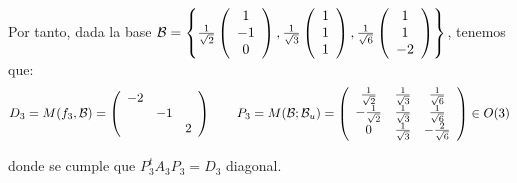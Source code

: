 \begin{ejercicio}
\begin{enumerate}
        Por tanto, dada la base $\mathcal{B}=\left\{\frac{1}{\sqrt{2}}\left(\begin{array}{c}
                1 \\ -1 \\ 0
            \end{array}\right),
            \frac{1}{\sqrt{3}}\left(\begin{array}{c}
                1 \\ 1 \\ 1 
            \end{array}\right),
            \frac{1}{\sqrt{6}}\left(\begin{array}{c}
                1 \\ 1 \\ -2 
        \end{array}\right)\right\}$, tenemos que:
        \begin{equation*}
            D_3=M(f_3,\mathcal{B})=\left(\begin{array}{ccc}
                -2 \\
                & -1\\
                && 2
            \end{array}\right)
            \qquad
            P_3=M(\mathcal{B};\mathcal{B}_u)=\left(\begin{array}{ccc}
                \frac{1}{\sqrt{2}} & \frac{1}{\sqrt{3}} & \frac{1}{\sqrt{6}} \\
                -\frac{1}{\sqrt{2}} & \frac{1}{\sqrt{3}} & \frac{1}{\sqrt{6}}\\
                0 & \frac{1}{\sqrt{3}} & -\frac{2}{\sqrt{6}}
            \end{array}\right) \in O(3)
        \end{equation*}

        donde se cumple que $P_3^tA_3P_3=D_3$ diagonal.

        
    \end{enumerate}
\end{ejercicio}

